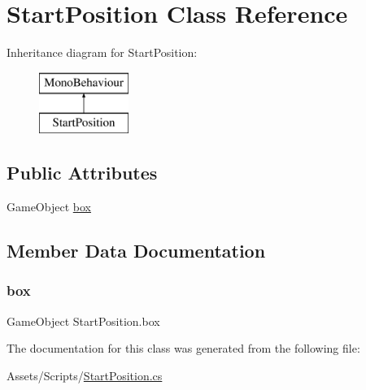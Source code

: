 \hypertarget{class_start_position}{}\section{Start\+Position Class Reference}
\label{class_start_position}
Inheritance diagram for Start\+Position\+:\begin{figure}[H]
\begin{center}
\leavevmode
\includegraphics[height=2.000000cm]{class_start_position}
\end{center}
\end{figure}
\subsection*{Public Attributes}
\begin{DoxyCompactItemize}
\item 
Game\+Object \mbox{\hyperlink{class_start_position_a7f963cf576a350e488904e256930c040}{box}}
\end{DoxyCompactItemize}


\subsection{Member Data Documentation}
\mbox{\label{class_start_position_a7f963cf576a350e488904e256930c040}} 
\subsubsection{\texorpdfstring{box}{box}}
{\footnotesize\ttfamily Game\+Object Start\+Position.\+box}



The documentation for this class was generated from the following file\+:\begin{DoxyCompactItemize}
\item 
Assets/\+Scripts/\mbox{\hyperlink{_start_position_8cs}{Start\+Position.\+cs}}\end{DoxyCompactItemize}
